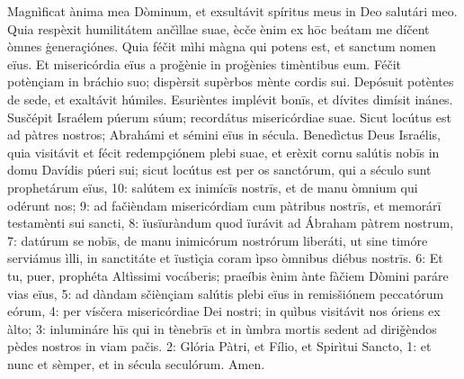 Magnìficat ànima mea Dòminum, et exsultávit spíritus meus in Deo salutári meo. Quia respèxit humilitátem ančìllae suae, ècče ènim ex hōc beátam me díčent òmnes ġeneraçiónes. Quia féčit mìhi màgna qui potens est, et sanctum nomen eïus. Et misericórdia eïus a proǧènie in proǧènies timèntibus eum. Féčit potènçiam in bráchio suo; dispèrsit supèrbos mènte cordis sui. Depósuit potèntes de sede, et exaltávit húmiles. Esurièntes implévit bonīs, et dívites dimísit inánes. Susčépit Israélem púerum súum; recordátus misericórdiae suae. Sicut locútus est ad pàtres nostros; Abrahámi et sémini eïus in sécula. 
Benedìctus Deus Israélis, quia visitávit et fécit redempçiónem plebi suae, 
et erèxit cornu salútis nobīs in domu Davídis púeri sui; 
sicut locútus est per os sanctórum, qui a século sunt prophetárum eïus, 
10: salútem ex inimícīs nostrīs, et de manu òmnium qui odérunt nos; 
9: ad fačièndam misericórdiam cum pàtribus nostrīs, et memorárī testamènti sui sancti, 
8: ïusïuràndum quod ïurávit ad Ábraham pàtrem nostrum,
7: datúrum se nobīs, de manu inimicórum nostrórum liberáti, ut sine timóre serviámus ìlli,
in sanctitáte et ïustìçia coram ìpso òmnibus diébus nostrīs. 
6: Et tu, puer, prophéta Altìssimi vocáberis; praeíbis ènim ànte fàčiem Dòmini paráre vias eïus, 
5: ad dàndam sčiènçiam salútis plebi eïus in remisšiónem peccatórum eórum, 
4: per vísčera misericórdiae Dei nostri; in quìbus visitávit nos óriens ex àlto; 
3: inlumináre hīs qui in tènebrīs et in ùmbra mortis sedent ad diriǧèndos pèdes nostros in viam pačis. 
2: Glória Pàtri, et Fílio, et Spirìtui Sancto, 
1: et nunc et sèmper, et in sécula seculórum. Amen.
